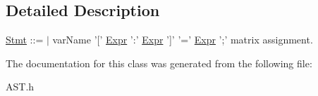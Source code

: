 \subsection{Detailed Description}
\hyperlink{classStmt}{Stmt} \-:\-:= $\vert$ var\-Name '\mbox{[}' \hyperlink{classExpr}{Expr} '\-:' \hyperlink{classExpr}{Expr} '\mbox{]}' '=' \hyperlink{classExpr}{Expr} ';' matrix assignment. 

The documentation for this class was generated from the following file\-:\begin{DoxyCompactItemize}
\item 
A\-S\-T.\-h\end{DoxyCompactItemize}
